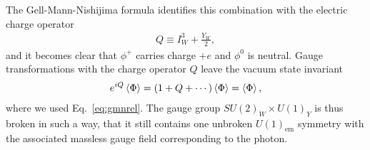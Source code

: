  The
Gell-Mann-Nishijima formula identifies this combination with the
electric charge operator
\begin{align}\label{eq:GMN}
  Q\equiv I^3_W+\frac{Y_W}{2},
\end{align}
and it becomes clear that $\phi^+$ carries charge
 $+e$ and $\phi^0$ is neutral. 
Gauge transformations with the charge operator $Q$ leave the vacuum state invariant
\begin{align}
   e^{iQ}\expval{\Phi} =( 1 + Q + \cdots)\expval{\Phi} = \expval{\Phi},
\end{align}
where we used Eq.~\eqref{eq:gmnrel}. The gauge group $SU(2)_{W}\times
U(1)_Y$ is thus broken in such a way, that it still contains one
unbroken $U(1)_{\text{em}}$ symmetry with the associated massless gauge field corresponding to the photon.


